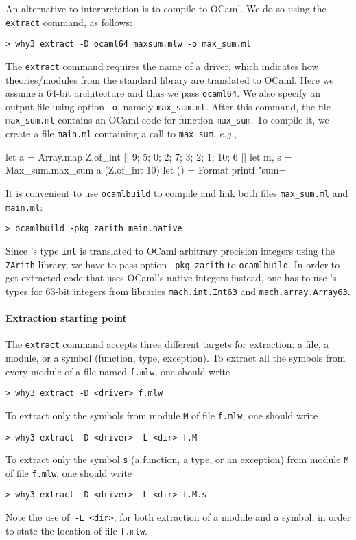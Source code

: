 An alternative to interpretation is to compile \whyml to OCaml.
We do so using the \texttt{extract} command, as follows:
\begin{verbatim}
> why3 extract -D ocaml64 maxsum.mlw -o max_sum.ml
\end{verbatim}
The \texttt{extract} command requires the name of a driver, which indicates
how theories/modules from the \why standard library are translated to
OCaml. Here we assume a 64-bit architecture and thus we pass
\texttt{ocaml64}. We also specify an output file using option
\verb+-o+, namely \texttt{max\_sum.ml}.
After this command, the file \texttt{max\_sum.ml} contains an OCaml
code for function \texttt{max\_sum}.
To compile it, we create a file \texttt{main.ml}
containing a call to \texttt{max\_sum}, \emph{e.g.},
\begin{whycode}
let a = Array.map Z.of_int [| 9; 5; 0; 2; 7; 3; 2; 1; 10; 6 |]
let m, s = Max_sum.max_sum a (Z.of_int 10)
let () = Format.printf "sum=%
\end{whycode}
It is convenient to use \texttt{ocamlbuild} to compile and link both
files \texttt{max\_sum.ml} and \texttt{main.ml}:
\begin{verbatim}
> ocamlbuild -pkg zarith main.native
\end{verbatim}
Since \why's type
\texttt{int} is translated to OCaml arbitrary precision integers using
the \texttt{ZArith} library, we have to pass option \texttt{-pkg
  zarith} to \texttt{ocamlbuild}. In order to get extracted code that
uses OCaml's native integers instead, one has to use \why's types for
63-bit integers from libraries \texttt{mach.int.Int63} and
\texttt{mach.array.Array63}.

\paragraph{Extraction starting point} The \texttt{extract} command accepts three
different targets for extraction: a \whyml file, a module, or a symbol
(function, type, exception). To extract all the symbols from every module of a
file named \texttt{f.mlw}, one should write
\begin{verbatim}
> why3 extract -D <driver> f.mlw
\end{verbatim}
To extract only the symbols from module \texttt{M} of file \texttt{f.mlw}, one
should write
\begin{verbatim}
> why3 extract -D <driver> -L <dir> f.M
\end{verbatim}
To extract only the symbol \texttt{s} (a function, a type, or an exception) from
module \texttt{M} of file \texttt{f.mlw}, one should write
\begin{verbatim}
> why3 extract -D <driver> -L <dir> f.M.s
\end{verbatim}
Note the use of~\texttt{-L <dir>}, for both extraction of a module and a symbol,
in order to state the location of file \texttt{f.mlw}.


